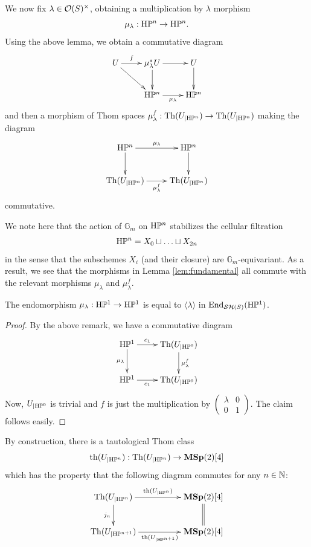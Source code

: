 \begin{num}
We now fix $\lambda\in \mathcal O(S)^\times$, obtaining a multiplication by $\lambda$ morphism
\[
\mu_{\lambda}:\mathrm{H}\mathbb P^n\to \mathrm{H}\mathbb P^n.
\]
Using the above lemma, we obtain a commutative diagram
\[
\xymatrix{U\ar[r]^-f\ar[rd] & \mu_{\lambda}^*U\ar[r]\ar[d] & U\ar[d] \\
 & \HP^n\ar[r]_-{\mu_{\lambda}} & \HP^n}
\]
and then a morphism of Thom spaces $\mu_{\lambda}^f:\mathrm{Th}(U_{\vert \mathrm{H}\mathbb P^n})\to \mathrm{Th}(U_{\vert \mathrm{H}\mathbb P^n})$ making the diagram 
\[
\xymatrix{\HP^n\ar[r]^-{\mu_{\lambda}}\ar[d] & \HP^n\ar[d] \\
\mathrm{Th}(U_{\vert \HP^n})\ar[r]_-{\mu_{\lambda}^f} & \mathrm{Th}(U_{\vert \HP^n})}
\] 
commutative. 

We note here that the action of $\mathbb{G}_m$ on $\mathrm{H}\mathbb P^n$ stabilizes the cellular filtration  
\[
\mathrm{H}\mathbb P^n=X_0\sqcup \ldots\sqcup X_{2n}
\] 
in the sense that the subschemes $X_i$ (and their closure) are $\mathbb{G}_m$-equivariant. As a result, we see that the morphisms in Lemma \ref{lem:fundamental} all commute with the relevant morphisms $\mu_{\lambda}$ and $\mu_{\lambda}^f$.

\begin{lm}\label{lem:initialize}
The endomorphism $\mu_{\lambda}:\mathrm{H}\mathbb P^1\to \mathrm{H}\mathbb P^1$ is equal to $\langle\lambda\rangle$ in $\mathrm{End}_{\mathcal{SH}(S)}(\mathrm{H}\mathbb P^1)$.
\end{lm}

\begin{proof}
By the above remark, we have a commutative diagram
\[
\xymatrix{\HP^1\ar[r]^-{c_1}\ar[d]_-{\mu_{\lambda}} & \mathrm{Th}(U_{\vert \HP^0})\ar[d]^-{\mu_{\lambda}^f} \\
\HP^1\ar[r]_-{c_1} & \mathrm{Th}(U_{\vert \HP^0})}
\]
Now, $U_{\vert \mathrm{H}\mathbb P^0}$ is trivial and $f$ is just the multiplication by $\begin{pmatrix} \lambda & 0 \\ 0 & 1\end{pmatrix}$. The claim follows easily. 
\end{proof}

By construction, there is a tautological Thom class 
\[
\mathrm{th}(U_{\vert \mathrm{H}\mathbb P^n}):\mathrm{Th}(U_{\vert \mathrm{H}\mathbb P^n})\to \mathbf{MSp}(2)[4]
\]
which has the property that the following diagram commutes for any $n\in\mathbb{N}$:
\[
\xymatrix@C=5em{\mathrm{Th}(U_{\vert \HP^n})\ar[r]^-{\mathrm{th}(U_{\vert \HP^n})}\ar[d]_-{j_n} & \mathbf{MSp}(2)[4]\ar@{=}[d] \\
\mathrm{Th}(U_{\vert \HP^{n+1}})\ar[r]_-{\mathrm{th}(U_{\vert \HP^{n+1}})} & \mathbf{MSp}(2)[4]}
\]


\end{num}
